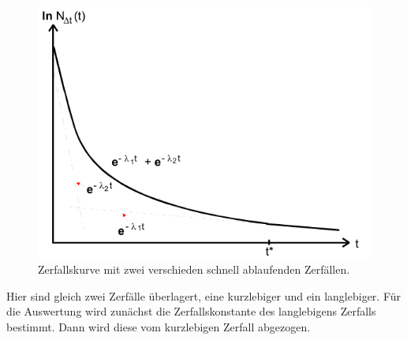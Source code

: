 \begin{figure}
    \centering
    \includegraphics[width=\textwidth]{images/bild2.png}
    \caption{Zerfallskurve mit zwei verschieden schnell ablaufenden Zerfällen.}
    \label{fig:zerfall}
\end{figure}

Hier sind gleich zwei Zerfälle überlagert, eine kurzlebiger und ein langlebiger.
Für die Auswertung wird zunächst die Zerfallskonstante des langlebigens Zerfalls bestimmt.
Dann wird diese vom kurzlebigen Zerfall abgezogen.